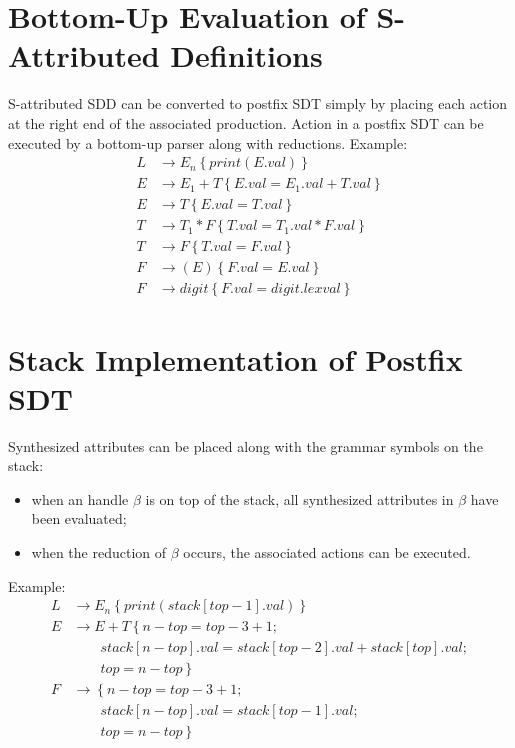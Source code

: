 \section{Bottom-Up Evaluation of S-Attributed Definitions}
S-attributed SDD can be converted to postfix SDT simply by placing each action at the right end of the associated production.
Action in a postfix SDT can be executed by a bottom-up parser along with reductions.
Example:
\begin{align*}
    L &\to E_n \left\{print(E.val)\right\} \\
    E &\to E_1 + T \left\{E.val = E_1.val + T.val\right\} \\
    E &\to T \left\{E.val = T.val\right\} \\
    T &\to T_1 \ast F \left\{T.val = T_1.val \ast F.val\right\} \\
    T &\to F \left\{T.val = F.val\right\} \\
    F &\to (E) \left\{F.val = E.val\right\} \\
    F &\to digit \left\{F.val = digit.lexval\right\}
\end{align*}

\section{Stack Implementation of Postfix SDT}
Synthesized attributes can be placed along with the grammar symbols on the stack:
\begin{itemize}
    \item when an handle $\beta$ is on top of the stack, all synthesized attributes in $\beta$ have been evaluated;
    \item when the reduction of $\beta$ occurs, the associated actions can be executed.
\end{itemize}
Example:
\begin{align*}
    L &\to E_n \left\{print(stack[top -1].val)\right\} \\
    E &\to E + T \left\{n - top = top - 3 + 1; \right. \\
        &\qquad \left. {} stack[n - top].val = stack[top - 2].val + stack[top].val; \right. \\
        &\qquad \left. {} top = n - top\right\} \\
    F &\to \left\{n - top = top - 3 + 1; \right. \\
        &\qquad \left. {} stack[n - top].val = stack[top - 1].val; \right. \\
        &\qquad \left. {} top = n - top\right\}
\end{align*}

